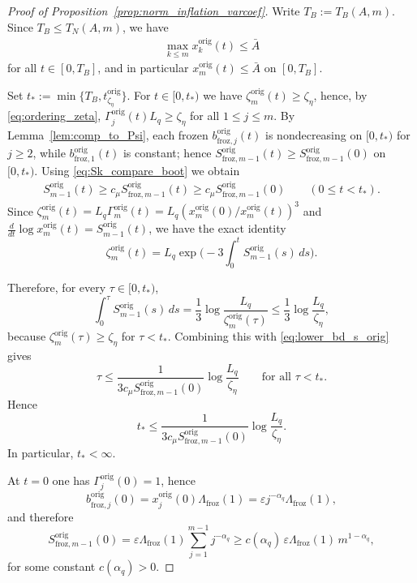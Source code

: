 \documentclass[reqno,11pt]{amsart}
\begin{document}
\begin{proof}[Proof of Proposition~\ref{prop:norm_inflation_varcoef}]
Write $T_B:=T_B(A,m)$.  Since $T_B\le T_N(A,m)$, we have 
\begin{align*}
\max_{k\le m}x_k^{\mathrm{orig}}(t)\le \bar A 
\end{align*}
for all
$t\in[0,T_B]$, and in particular $x_m^{\mathrm{orig}}(t)\le \bar A$ on $[0,T_B]$.

\smallskip
{}
Set $t_*:=\min\{T_B,t_{\zeta_\eta}^{\mathrm{orig}}\}$.  For $t\in[0,t_*)$ we have $\zeta_m^{\mathrm{orig}}(t)\ge\zeta_\eta$, hence, by \eqref{eq:ordering_zeta},
$\Gamma_j^{\mathrm{orig}}(t)L_q\ge\zeta_\eta$ for all $1\le j\le m$.  By Lemma~\ref{lem:comp_to_Psi}, each frozen $b_{\mathrm{froz},j}^{\mathrm{orig}}(t)$ is nondecreasing on $[0,t_*)$ for $j\geq 2$,  while $b_{\mathrm{froz},1}^{\mathrm{orig}}(t)$ is constant; hence
$S_{\mathrm{froz},m-1}^{\mathrm{orig}}(t)\ge S_{\mathrm{froz},m-1}^{\mathrm{orig}}(0)$ on $[0,t_*)$.  Using \eqref{eq:Sk_compare_boot} we obtain
\begin{align}
\label{eq:lower_bd_s_orig}
S_{m-1}^{\mathrm{orig}}(t)
\ge c_\mu 
S_{\mathrm{froz},m-1}^{\mathrm{orig}}(t)
\ge c_\mu 
S_{\mathrm{froz},m-1}^{\mathrm{orig}}(0)\qquad (0\le t< t_*).
\end{align}
Since $\zeta_m^{\mathrm{orig}}(t)=L_q\Gamma_m^{\mathrm{orig}}(t)=L_q(x_m^{\mathrm{orig}}(0)/x_m^{\mathrm{orig}}(t))^3$ and $\frac{d}{dt}\log x_m^{\mathrm{orig}}(t)=S_{m-1}^{\mathrm{orig}}(t)$,
we have the exact identity
\[
\zeta_m^{\mathrm{orig}}(t)=L_q\exp\Big(-3\int_0^t S_{m-1}^{\mathrm{orig}}(s)\,ds\Big).
\]

Therefore, for every $\tau\in[0,t_*)$,
\[
\int_0^{\tau}S_{m-1}^{\mathrm{orig}}(s)\,ds
=
\frac13\log\frac{L_q}{\zeta_m^{\mathrm{orig}}(\tau)}
\le \frac13\log\frac{L_q}{\zeta_\eta},
\]
because $\zeta_m^{\mathrm{orig}}(\tau)\ge \zeta_\eta$ for $\tau<t_*$. Combining this with
\eqref{eq:lower_bd_s_orig} gives
\[
\tau\le \frac{1}{3c_\mu S_{\mathrm{froz},m-1}^{\mathrm{orig}}(0)}\log\frac{L_q}{\zeta_\eta}
\qquad\text{for all }\tau<t_*.
\]
Hence
\[
t_*\le \frac{1}{3c_\mu S_{\mathrm{froz},m-1}^{\mathrm{orig}}(0)}\log\frac{L_q}{\zeta_\eta}.
\]
In particular, $t_* < \infty$.

At $t=0$ one has $\Gamma_j^{\mathrm{orig}}(0)=1$, hence
\[
b_{\mathrm{froz},j}^{\mathrm{orig}}(0)=x_j^{\mathrm{orig}}(0)\Lambda_{\mathrm{froz}}(1)=\varepsilon j^{-\alpha_q}\Lambda_{\mathrm{froz}}(1),
\]
and therefore
\[
S_{\mathrm{froz},m-1}^{\mathrm{orig}}(0)=\varepsilon\Lambda_{\mathrm{froz}}(1)\sum_{j=1}^{m-1} j^{-\alpha_q}
\ge c(\alpha_q)\,\varepsilon\Lambda_{\mathrm{froz}}(1)\,m^{1-\alpha_q},
\]
for some constant $c(\alpha_q)>0$.


\end{proof}
\end{document}
